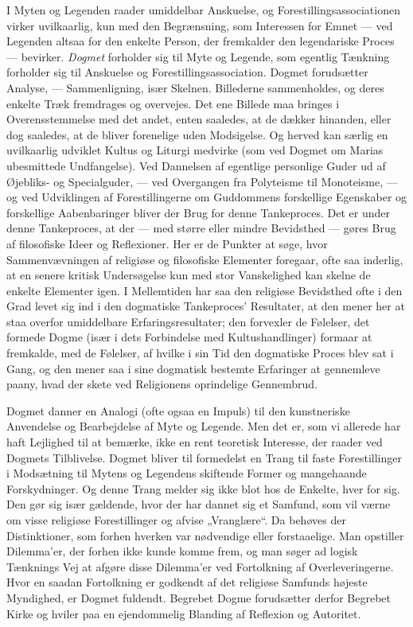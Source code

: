 \documentclass[12pt,a4paper,openany]{book}
\newcommand{\opage}[1]{\marginnote{\footnotesize\textit{[#1]}}}
\begin{document}
I Myten og Legenden raader umiddelbar Anskuelse, og
Forestillingsassociationen virker uvilkaarlig, kun med den Begrænsning,
som Interessen for Emnet --- ved Legenden altsaa for den enkelte Person,
der fremkalder den legendariske Proces --- bevirker. \textit{Dogmet}
forholder sig til Myte og Legende, som egentlig Tænkning forholder sig
til Anskuelse og Forestillingsassociation. Dogmet forudsætter Analyse,
--- Sammenligning, især Skelnen. Billederne sammenholdes, og deres
enkelte Træk fremdrages og overvejes. Det ene Billede maa bringes i
Overensstemmelse med
\opage{135}det andet, enten saaledes, at de dækker hinanden, eller dog
saaledes, at de bliver forenelige uden Modsigelse. Og herved kan særlig
en uvilkaarlig udviklet Kultus og Liturgi medvirke (som ved Dogmet om
Marias ubesmittede Undfangelse). Ved Dannelsen af egentlige personlige
Guder ud af Øjebliks- og Specialguder, --- ved Overgangen fra Polyteisme
til Monoteisme, --- og ved Udviklingen af Forestillingerne om Guddommens
forskellige Egenskaber og forskellige Aabenbaringer bliver der Brug for
denne Tankeproces. Det er under denne Tankeproces, at der --- med større
eller mindre Bevidsthed --- gøres Brug af filosofiske Ideer og
Reflexioner. Her er de Punkter at søge, hvor Sammenvævningen af
religiøse og filosofiske Elementer foregaar, ofte saa inderlig, at en
senere kritisk Undersøgelse kun med stor Vanskelighed kan skelne de
enkelte Elementer igen. I Mellemtiden har saa den religiøse Bevidsthed
ofte i den Grad levet sig ind i den dogmatiske Tankeproces’ Resultater,
at den mener her at staa overfor umiddelbare Erfaringsresultater; den
forvexler de Følelser, det formede Dogme (især i dets Forbindelse med
Kultushandlinger) formaar at fremkalde, med de Følelser, af hvilke i sin
Tid den dogmatiske Proces blev sat i Gang, og den mener saa i sine
dogmatisk bestemte Erfaringer at gennemleve paany, hvad der skete ved
Religionens oprindelige Gennembrud.

Dogmet danner en Analogi (ofte ogsaa en Impuls) til den kunstneriske
Anvendelse og Bearbejdelse af Myte og Legende. Men det er, som vi
allerede har haft Lejlighed til at bemærke, ikke en rent teoretisk
Interesse, der raader ved Dogmets Tilblivelse. Dogmet bliver til
formedelst en Trang til faste Forestillinger i Modsætning til Mytens og
Legendens skiftende Former og mangehaande Forskydninger. Og denne Trang
melder sig ikke blot hos de Enkelte, hver for sig. Den gør sig især
gældende, hvor der har dannet sig et Samfund, som vil værne om visse
religiøse Forestillinger og afvise „Vranglære“. Da behøves der
Distinktioner, som forhen hverken var nødvendige eller forstaaelige. Man
opstiller Dilemma’er, der forhen ikke kunde komme frem, og man søger ad
logisk Tænknings Vej at afgøre disse Dilemma’er ved Fortolkning af
Overleveringerne. Hvor en saadan Fortolkning er godkendt af det
religiøse Samfunds højeste Myndighed, er Dogmet fuldendt. Begrebet Dogme
forudsætter derfor Begrebet Kirke og hviler paa en ejendommelig Blanding
af Reflexion og Autoritet.
\end{document}
